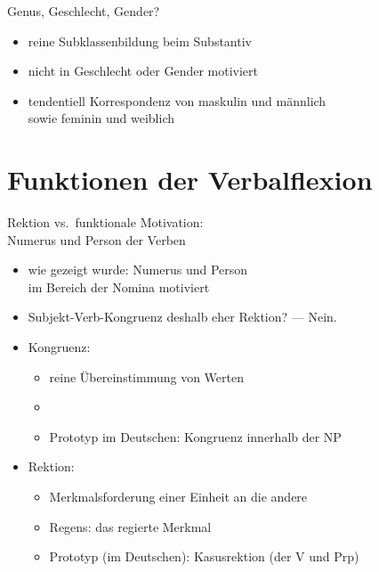 \begin{frame}
  {Genus, Geschlecht, Gender?}
  \pause
  \begin{exe}
    \ex \label{ex:genus039}
    \begin{xlist}
    \end{xlist}
  \end{exe}
  \pause
  \Halbzeile
  \begin{itemize}[<+->]
    \item reine \alert{Subklassenbildung} beim Substantiv
    \item nicht in Geschlecht oder Gender motiviert
    \item tendentiell Korrespondenz von maskulin und männlich\\
      sowie feminin und weiblich
  \end{itemize}
\end{frame}

\section{Funktionen der Verbalflexion}

\begin{frame}
  {Rektion vs.\ funktionale Motivation:\\
  Numerus und Person der Verben}
  \pause
  \begin{itemize}[<+->]
    \item wie gezeigt wurde: \alert{Numerus} und \alert{Person}\\
      im Bereich der Nomina motiviert
    \item Subjekt-Verb-Kongruenz deshalb eher \alert{Rektion}? --- Nein.
      \Halbzeile
    \item Kongruenz:
      \begin{itemize}[<+->]
        \item reine \alert{Übereinstimmung von Werten}
        \item {}
        \item Prototyp im Deutschen: \alert{Kongruenz innerhalb der NP}
      \end{itemize}
      \Halbzeile
    \item Rektion:
      \begin{itemize}[<+->]
        \item \alert{Merkmalsforderung} einer Einheit an die andere
        \item Regens:  das regierte Merkmal
        \item Prototyp (im Deutschen): \alert{Kasusrektion} (der V und Prp)
      \end{itemize}
  \end{itemize}
\end{frame}


